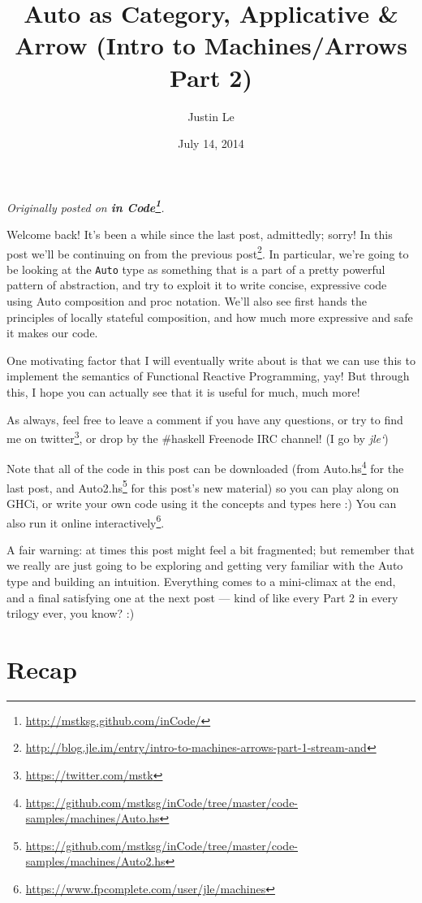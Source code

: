 \documentclass[]{article}
\title{Auto as Category, Applicative \& Arrow (Intro to Machines/Arrows Part 2)}
\author{Justin Le}
\date{July 14, 2014}
\renewcommand{\href}[2]{#2\footnote{\url{#1}}}
\begin{document}
\maketitle

\emph{Originally posted on
\textbf{\href{http://mstksg.github.com/inCode/}{in Code}}.}

Welcome back! It's been a while since the last post, admittedly; sorry!
In this post we'll be continuing on from
\href{http://blog.jle.im/entry/intro-to-machines-arrows-part-1-stream-and}{the
previous post}. In particular, we're going to be looking at the
\texttt{Auto} type as something that is a part of a pretty powerful
pattern of abstraction, and try to exploit it to write concise,
expressive code using Auto composition and proc notation. We'll also see
first hands the principles of locally stateful composition, and how much
more expressive and safe it makes our code.

One motivating factor that I will eventually write about is that we can
use this to implement the semantics of Functional Reactive Programming,
yay! But through this, I hope you can actually see that it is useful for
much, much more!

As always, feel free to leave a comment if you have any questions, or
try to find me on \href{https://twitter.com/mstk}{twitter}, or drop by
the \#haskell Freenode IRC channel! (I go by \emph{jle`})

Note that all of the code in this post can be downloaded (from
\href{https://github.com/mstksg/inCode/tree/master/code-samples/machines/Auto.hs}{Auto.hs}
for the last post, and
\href{https://github.com/mstksg/inCode/tree/master/code-samples/machines/Auto2.hs}{Auto2.hs}
for this post's new material) so you can play along on GHCi, or write
your own code using it the concepts and types here :) You can also run
it \href{https://www.fpcomplete.com/user/jle/machines}{online
interactively}.

A fair warning: at times this post might feel a bit fragmented; but
remember that we really are just going to be exploring and getting very
familiar with the Auto type and building an intuition. Everything comes
to a mini-climax at the end, and a final satisfying one at the next post
--- kind of like every Part 2 in every trilogy ever, you know? :)

\section{Recap}\label{recap}
\end{document}
